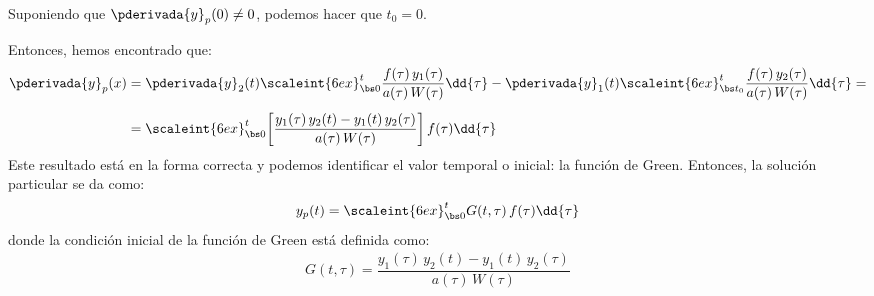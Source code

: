 Suponiendo que $\pderivada{y}_{p} (0) \neq 0$, podemos hacer que $t_{0} = 0$.
\par
Entonces, hemos encontrado que:
\begin{align}
\begin{aligned}[b]
\pderivada{y}_{p} (x) &= \pderivada{y}_{2} (t) \scaleint{6ex}_{\bs 0}^{t} \dfrac{f (\tau) \, y_{1} (\tau)}{a (\tau) \, W (\tau)} \dd{\tau} - \pderivada{y}_{1} (t) \scaleint{6ex}_{\bs t_{0}}^{t} \dfrac{f (\tau) \, y_{2} (\tau)}{a (\tau) \, W (\tau)} \dd{\tau} = \\[0.5em]
&= \scaleint{6ex}_{\bs 0}^{t} \bigg[ \dfrac{y_{1} (\tau) \, y_{2} (t) - y_{1} (t) \, y_{2} (\tau)}{a (\tau) \, W (\tau)} \bigg] \, f (\tau) \dd{\tau}
\end{aligned}
\label{eq:ecuacion_07_19}
\end{align}
Este resultado está en la forma correcta y podemos identificar el valor temporal o inicial: la función de Green. Entonces, la solución particular se da como:
\begin{align}
y_{p} (t) = \scaleint{6ex}_{\bs 0}^{t} G (t, \tau) \, f (\tau) \dd{\tau}
\label{eq:ecuacion_07_20}
\end{align}
donde la condición inicial de la función de Green está definida como:
\begin{align*}
G (t, \tau) = \dfrac{y_{1} (\tau) \, y_{2} (t) - y_{1} (t) \, y_{2} (\tau)}{a (\tau) \, W (\tau)}
\end{align*}
